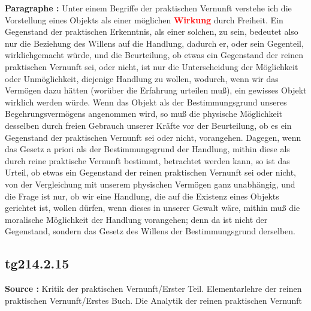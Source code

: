 \documentclass[a4paper,12pt,twoside]{book}
\newcommand{\match}[1]{\textcolor{red}{\textbf{#1}}}
\begin{document}
	\noindent\textbf{Paragraphe : }Unter einem Begriffe der praktischen Vernunft verstehe ich die Vorstellung eines Objekts als einer möglichen \match{Wirkung} durch Freiheit. Ein Gegenstand der praktischen Erkenntnis, als einer solchen, zu sein, bedeutet also nur die Beziehung des Willens auf die Handlung, dadurch er, oder sein Gegenteil, wirklichgemacht würde, und die Beurteilung, ob etwas ein Gegenstand der reinen praktischen Vernunft sei, oder nicht, ist nur die Unterscheidung der Möglichkeit oder Unmöglichkeit, diejenige Handlung zu wollen, wodurch, wenn wir das Vermögen dazu hätten (worüber die Erfahrung urteilen muß), ein gewisses Objekt wirklich werden würde. Wenn das Objekt als der Bestimmungsgrund unseres Begehrungsvermögens angenommen wird, so muß die physische Möglichkeit desselben durch freien Gebrauch unserer Kräfte vor der Beurteilung, ob es ein Gegenstand der praktischen Vernunft sei oder nicht, vorangehen. Dagegen, wenn das Gesetz a priori als der Bestimmungsgrund der Handlung, mithin diese als durch reine praktische Vernunft bestimmt, betrachtet werden kann, so ist das Urteil, ob etwas ein Gegenstand der reinen praktischen Vernunft sei oder nicht, von der Vergleichung mit unserem physischen Vermögen ganz unabhängig, und die Frage ist nur, ob wir eine Handlung, die auf die Existenz eines Objekts gerichtet ist, wollen dürfen, wenn dieses in unserer Gewalt wäre, mithin muß die moralische Möglichkeit der Handlung vorangehen; denn da ist nicht der Gegenstand, sondern das Gesetz des Willens der Bestimmungsgrund derselben. 
	
	\subsection*{tg214.2.15} 
	\textbf{Source : }Kritik der praktischen Vernunft/Erster Teil. Elementarlehre der reinen praktischen Vernunft/Erstes Buch. Die Analytik der reinen praktischen Vernunft\\  
	
\end{document}
